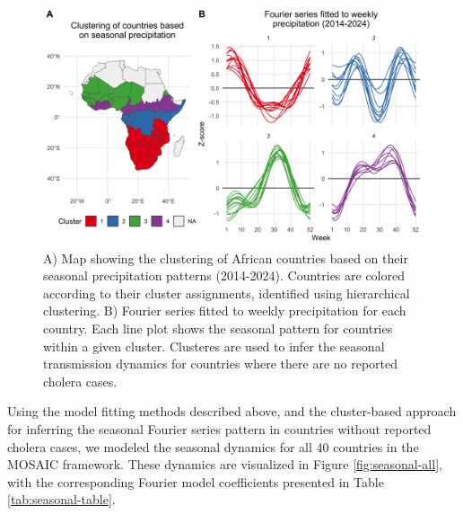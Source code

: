\documentclass[
]{book}
\begin{document}
\begin{figure}

{\centering \includegraphics[width=1\linewidth]{figures/seasonal_precip_ward.D2_cluster} 

}

\caption{A) Map showing the clustering of African countries based on their seasonal precipitation patterns (2014-2024). Countries are colored according to their cluster assignments, identified using hierarchical clustering. B) Fourier series fitted to weekly precipitation for each country. Each line plot shows the seasonal pattern for countries within a given cluster. Clusteres are used to infer the seasonal transmission dynamics for countries where there are no reported cholera cases.}\label{fig:seasonal-cluster}
\end{figure}

Using the model fitting methods described above, and the cluster-based approach for inferring the seasonal Fourier series pattern in countries without reported cholera cases, we modeled the seasonal dynamics for all 40 countries in the MOSAIC framework. These dynamics are visualized in Figure \ref{fig:seasonal-all}, with the corresponding Fourier model coefficients presented in Table \ref{tab:seasonal-table}.
\end{document}
